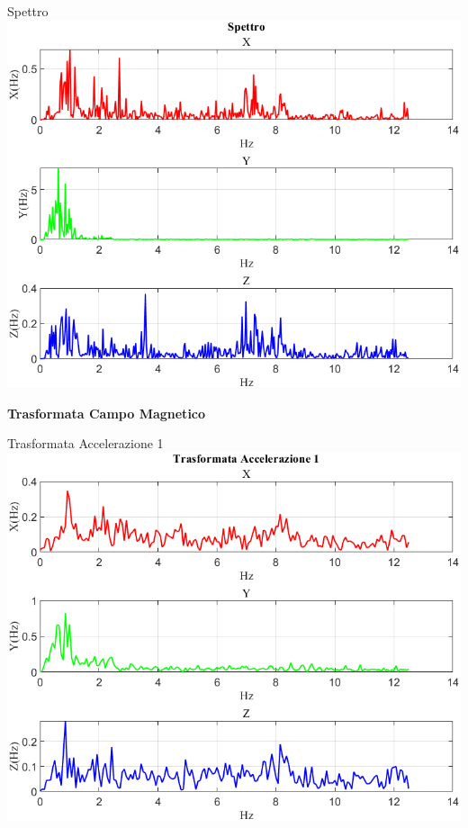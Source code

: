 \documentclass[beamer]{standalone}
\begin{document}
	\begin{frame}{{Spettro}}
		\centering\includegraphics[height=.8\textheight]{figure/Mag/Trasformata/Spettro}
	\end{frame}
	
	\begin{frame}
		\color{blue}\centering\huge{\textbf{Trasformata Campo Magnetico}}
	\end{frame}
	
	\begin{frame}{{Trasformata Accelerazione 1}}
		\centering\includegraphics[height=.8\textheight]{figure/Mag/Trasformata/Trasformata Accelerazione 1}
	\end{frame}
	
\end{document}
